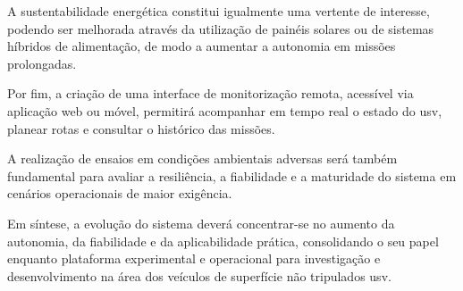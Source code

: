 A sustentabilidade energética constitui igualmente uma vertente de interesse, podendo ser melhorada através da utilização de painéis solares ou de sistemas híbridos de alimentação, de modo a aumentar a autonomia em missões prolongadas.  

Por fim, a criação de uma interface de monitorização remota, acessível via aplicação web ou móvel, permitirá acompanhar em tempo real o estado do \gls{usv}, planear rotas e consultar o histórico das missões.  

A realização de ensaios em condições ambientais adversas será também fundamental para avaliar a resiliência, a fiabilidade e a maturidade do sistema em cenários operacionais de maior exigência.  

Em síntese, a evolução do sistema deverá concentrar-se no aumento da autonomia, da fiabilidade e da aplicabilidade prática, consolidando o seu papel enquanto plataforma experimental e operacional para investigação e desenvolvimento na área dos veículos de superfície não tripulados \gls{usv}.

